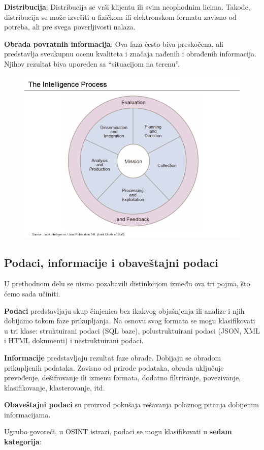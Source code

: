 \documentclass[a4paper, 11pt]{article}
\begin{document}
{\bf Distribucija}: Distribucija se vrši klijentu ili svim neophodnim licima. Takođe, distribucija se može izvršiti u fizičkom ili elektronskom formatu zavisno od potreba, ali pre svega poverljivosti nalaza.\newline

{\bf Obrada povratnih informacija}: Ova faza često biva preskočena, ali predstavlja sveukupnu ocenu kvaliteta i značaja nađenih i obrađenih informacija. Njihov rezultat biva upoređen sa “situacijom na terenu”.
\begin{figure}[!h]
    \centering
    \includegraphics[width=0.5\linewidth]{800px-The_Intelligence_Process_JP_2-0.png}
\end{figure}
\subsection{Podaci, informacije i obaveštajni podaci}
U prethodnom delu se nismo pozabavili distinkcijom između ova tri pojma, što ćemo sada učiniti.\newline

{\bf Podaci} predstavljaju skup činjenica bez ikakvog objašnjenja ili analize i njih dobijamo tokom faze prikupljanja. Na osnovu svog formata se mogu klasifikovati u tri klase: struktuirani podaci (SQL baze), polustruktuirani podaci (JSON, XML i HTML dokumenti) i nestruktuirani podaci.\newline

{\bf Informacije} predstavljaju rezultat faze obrade. Dobijaju se obradom prikupljenih podataka. Zavisno od prirode podataka, obrada uključuje prevođenje, dešifrovanje ili izmenu formata, dodatno filtriranje, povezivanje, klasifikovanje, klasterovanje, itd.\newline

{\bf Obaveštajni podaci} su proizvod pokušaja rešavanja polaznog pitanja dobijenim informacijama. \newline

Ugrubo govoreći, u OSINT istrazi, podaci se mogu klasifikovati u {\bf sedam kategorija}:\newline
\end{document}
